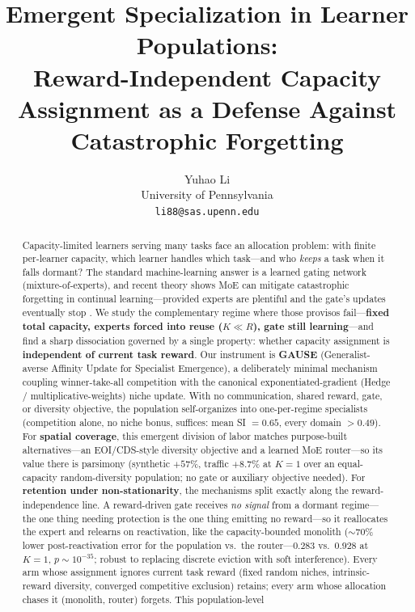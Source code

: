 \documentclass{article}
\title{Emergent Specialization in Learner Populations:\\
Reward-Independent Capacity Assignment as a Defense Against Catastrophic Forgetting}
\author{
  Yuhao Li\\
  University of Pennsylvania \\
  \texttt{li88@sas.upenn.edu}
}
\begin{document}
\maketitle

\begin{abstract}
Capacity-limited learners serving many tasks face an allocation problem: with
finite per-learner capacity, which learner handles which task---and who
\emph{keeps} a task when it falls dormant? The standard machine-learning answer
is a learned gating network (mixture-of-experts), and recent theory shows MoE can
mitigate catastrophic forgetting in continual learning---provided experts are
plentiful and the gate's updates eventually stop \cite{li2024moecl}. We study the
complementary regime where those provisos fail---\textbf{fixed total capacity,
experts forced into reuse ($K \ll R$), gate still learning}---and find a sharp
dissociation governed by a single property: whether capacity assignment is
\textbf{independent of current task reward}.
Our instrument is \textbf{GAUSE} (Generalist-averse Affinity Update for
Specialist Emergence), a deliberately minimal mechanism
coupling winner-take-all competition with the canonical exponentiated-gradient
(Hedge / multiplicative-weights) niche update. With no communication, shared
reward, gate, or diversity objective, the population self-organizes into
one-per-regime specialists (competition alone, no niche bonus, suffices: mean SI
$= 0.65$, every domain $> 0.49$). For \textbf{spatial coverage}, this emergent
division of labor matches purpose-built alternatives---an EOI/CDS-style diversity
objective and a learned MoE router---so its value there is parsimony (synthetic
$+57\%$, traffic $+8.7\%$ at $K{=}1$ over an equal-capacity random-diversity
population; no gate or auxiliary objective needed). For \textbf{retention under
non-stationarity}, the mechanisms split exactly along the reward-independence
line. A reward-driven gate receives \emph{no signal} from a dormant regime---the
one thing needing protection is the one thing emitting no reward---so it
reallocates the expert and relearns on reactivation, like the capacity-bounded
monolith ($\sim$70\% lower post-reactivation error for the population vs.\ the
router---$0.283$ vs.\ $0.928$ at $K{=}1$, $p\sim10^{-35}$; robust to replacing
discrete eviction with soft interference).
Every arm whose assignment ignores current task reward (fixed random niches,
intrinsic-reward diversity, converged competitive exclusion) retains; every arm
whose allocation chases it (monolith, router) forgets. This population-level

\end{abstract}
\end{document}
